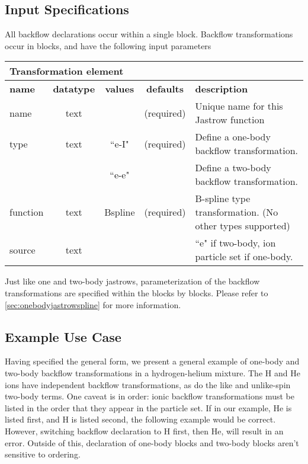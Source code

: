 \subsection{Input Specifications}
All backflow declarations occur within a single  block.  Backflow transformations occur in  blocks, and have the following input parameters

\begin{table}[h]
\begin{center}
\begin{tabular}{l c c c l }
\hline
\multicolumn{5}{l}{Transformation element} \\
\hline
\bfseries name & \bfseries datatype & \bfseries values & \bfseries defaults  & \bfseries description \\
\hline
name & text &  & (required) & Unique name for this Jastrow function \\
type & text & ``e-I" & (required) & Define a one-body backflow transformation. \\ 
        &          & ``e-e" & & Define a two-body backflow transformation. \\
function & text & Bspline & (required) & B-spline type transformation. (No other types supported) \\
source & text &  &  & ``e" if two-body, ion particle set if one-body.\\ 
  \hline
\end{tabular}
\end{center}
\end{table}

Just like one and two-body jastrows, parameterization of the backflow transformations are specified within the  blocks by   blocks.  Please refer to \ref{sec:onebodyjastrowspline} for more information.

\subsection{Example Use Case}
Having specified the general form, we present a general example of one-body and two-body backflow transformations in a hydrogen-helium mixture.  The H and He ions have independent backflow transformations, as do the like and unlike-spin two-body terms.  One caveat is in order:  ionic backflow transformations must be listed in the order that they appear in the particle set.  If in our example, He is listed first, and H is listed second, the following example would be correct.  However, switching backflow declaration to H first, then He, will result in an error.  Outside of this, declaration of one-body blocks and two-body blocks aren't sensitive to ordering.  

